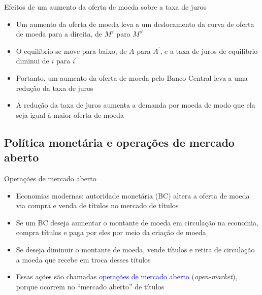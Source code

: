 \documentclass[10pt]{beamer}
\begin{document}
\begin{frame}{Efeitos de um aumento da oferta de moeda sobre a taxa de juros}
\begin{itemize}
    \item Um aumento da oferta de moeda leva a um deslocamento da curva de oferta de moeda para a direita, de $M^s$ para $M^{s'}$
    \bigskip
    \item O equilíbrio se move para baixo, de $A$ para $A^{'}$, e a taxa de juros de equilíbrio diminui de $i$ para $i^{'}$
    \bigskip
    \item Portanto, um aumento da oferta de moeda pelo Banco Central leva a uma redução da taxa de juros
    \bigskip
    \item A redução da taxa de juros aumenta a demanda por moeda de modo que ela seja igual à maior oferta de moeda
\end{itemize}
\end{frame}

\subsection{Política monetária e operações de mercado aberto}
\begin{frame}{Operações de mercado aberto}
\begin{itemize}
    \item Economias modernas: autoridade monetária (BC) altera a oferta de moeda via compra e venda de títulos no mercado de títulos
    \bigskip
    \item Se um BC deseja aumentar o montante de moeda em circulação na economia, compra títulos e paga por eles por meio da criação de moeda
    \bigskip
    \item Se deseja diminuir o montante de moeda, vende títulos e retira de circulação a moeda que recebe em troca desses títulos
    \bigskip
    \item Essas ações são chamadas \textcolor{blue}{operações de mercado aberto} (\emph{open-market}), porque ocorrem no ``mercado aberto'' de títulos
\end{itemize}    
\end{frame}
\end{document}
